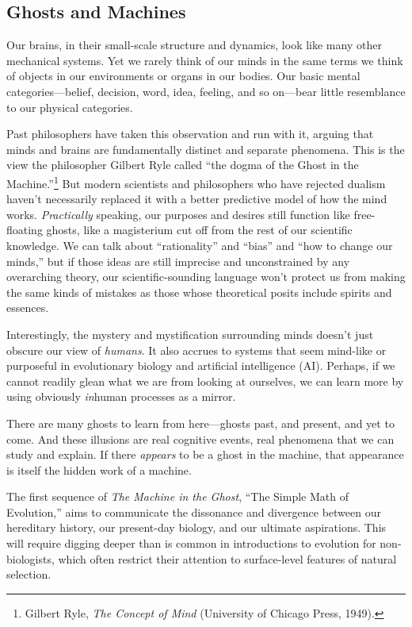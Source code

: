 \subsection{Ghosts and Machines}


 Our brains, in their small-scale structure and dynamics, look like
many other mechanical systems. Yet we rarely think of our minds in the
same terms we think of objects in our environments or organs in our
bodies. Our basic mental categories---belief, decision, word, idea,
feeling, and so on---bear little resemblance to our physical
categories.


 Past philosophers have taken this observation and run with it,
arguing that minds and brains are fundamentally distinct and separate
phenomena. This is the view the philosopher Gilbert Ryle called
``the dogma of the Ghost in the
Machine.''\footnote{Gilbert Ryle, \textit{The Concept of Mind} (University of
Chicago Press, 1949).} But modern scientists
and philosophers who have rejected dualism haven't
necessarily replaced it with a better predictive model of how the mind
works. \textit{Practically} speaking, our purposes and desires still
function like free-floating ghosts, like a magisterium cut off from the
rest of our scientific knowledge. We can talk about
``rationality'' and
``bias'' and ``how
to change our minds,'' but if those ideas are still
imprecise and unconstrained by any overarching theory, our
scientific-sounding language won't protect us from
making the same kinds of mistakes as those whose theoretical posits
include spirits and essences.


 Interestingly, the mystery and mystification surrounding minds
doesn't just obscure our view of \textit{humans}. It
also accrues to systems that seem mind-like or purposeful in
evolutionary biology and artificial intelligence (AI). Perhaps, if we
cannot readily glean what we are from looking at ourselves, we can
learn more by using obviously \textit{in}human processes as a mirror.


 There are many ghosts to learn from here---ghosts past, and
present, and yet to come. And these illusions are real cognitive
events, real phenomena that we can study and explain. If there
\textit{appears} to be a ghost in the machine, that appearance is
itself the hidden work of a machine.


 The first sequence of \textit{The Machine in the Ghost},
``The Simple Math of Evolution,''
aims to communicate the dissonance and divergence between our
hereditary history, our present-day biology, and our ultimate
aspirations. This will require digging deeper than is common in
introductions to evolution for non-biologists, which often restrict
their attention to surface-level features of natural selection.



